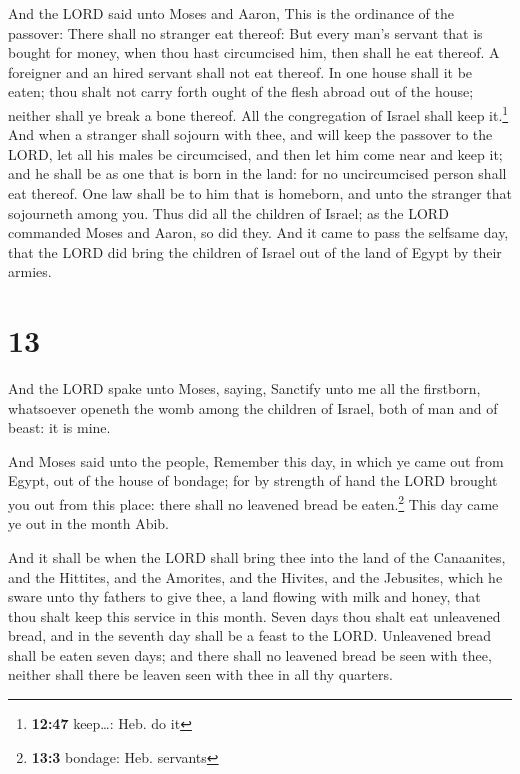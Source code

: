  And the LORD said unto Moses and Aaron, This is the
ordinance of the passover: There shall no stranger eat thereof:
 But every man's servant that is bought for money, when
thou hast circumcised him, then shall he eat thereof.  A
foreigner and an hired servant shall not eat thereof.  In
one house shall it be eaten; thou shalt not carry forth ought of the
flesh abroad out of the house; neither shall ye break a bone thereof.
 All the congregation of Israel shall keep it.\footnote{\textbf{12:47}
  keep\ldots: Heb. do it}  And when a stranger shall
sojourn with thee, and will keep the passover to the LORD, let all his
males be circumcised, and then let him come near and keep it; and he
shall be as one that is born in the land: for no uncircumcised person
shall eat thereof.  One law shall be to him that is
homeborn, and unto the stranger that sojourneth among you.
 Thus did all the children of Israel; as the LORD
commanded Moses and Aaron, so did they.  And it came to
pass the selfsame day, that the LORD did bring the children of Israel
out of the land of Egypt by their armies.

\hypertarget{section-12}{%
\section{13}\label{section-12}}

 And the LORD spake unto Moses, saying, 
Sanctify unto me all the firstborn, whatsoever openeth the womb among
the children of Israel, both of man and of beast: it is mine.

 And Moses said unto the people, Remember this day, in
which ye came out from Egypt, out of the house of bondage; for by
strength of hand the LORD brought you out from this place: there shall
no leavened bread be eaten.\footnote{\textbf{13:3} bondage: Heb.
  servants}  This day came ye out in the month Abib.

 And it shall be when the LORD shall bring thee into the
land of the Canaanites, and the Hittites, and the Amorites, and the
Hivites, and the Jebusites, which he sware unto thy fathers to give
thee, a land flowing with milk and honey, that thou shalt keep this
service in this month.  Seven days thou shalt eat
unleavened bread, and in the seventh day shall be a feast to the LORD.
 Unleavened bread shall be eaten seven days; and there
shall no leavened bread be seen with thee, neither shall there be leaven
seen with thee in all thy quarters.

